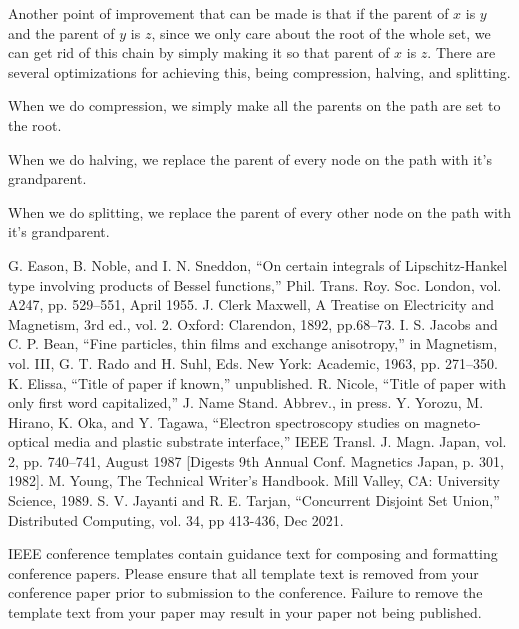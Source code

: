 \documentclass[conference]{IEEEtran}
\begin{document}
Another point of improvement that can be made is that if the parent of $x$ is $y$ and the parent of $y$ is $z$, since we only care about the root of the whole set, we can get rid of this chain by simply making it so that parent of $x$ is $z$. There are several optimizations for achieving this, being compression, halving, and splitting.

When we do compression, we simply make all the parents on the path are set to the root.



When we do halving, we replace the parent of every node on the path with it's grandparent.



When we do splitting, we replace the parent of every other node on the path with it's grandparent.



\begin{thebibliography}{00}
 G. Eason, B. Noble, and I. N. Sneddon, ``On certain integrals of Lipschitz-Hankel type involving products of Bessel functions,'' Phil. Trans. Roy. Soc. London, vol. A247, pp. 529--551, April 1955.
 J. Clerk Maxwell, A Treatise on Electricity and Magnetism, 3rd ed., vol. 2. Oxford: Clarendon, 1892, pp.68--73.
 I. S. Jacobs and C. P. Bean, ``Fine particles, thin films and exchange anisotropy,'' in Magnetism, vol. III, G. T. Rado and H. Suhl, Eds. New York: Academic, 1963, pp. 271--350.
 K. Elissa, ``Title of paper if known,'' unpublished.
 R. Nicole, ``Title of paper with only first word capitalized,'' J. Name Stand. Abbrev., in press.
 Y. Yorozu, M. Hirano, K. Oka, and Y. Tagawa, ``Electron spectroscopy studies on magneto-optical media and plastic substrate interface,'' IEEE Transl. J. Magn. Japan, vol. 2, pp. 740--741, August 1987 [Digests 9th Annual Conf. Magnetics Japan, p. 301, 1982].
 M. Young, The Technical Writer's Handbook. Mill Valley, CA: University Science, 1989.
 S. V. Jayanti and R. E. Tarjan, ``Concurrent Disjoint Set Union,'' Distributed Computing, vol. 34, pp 413-436, Dec 2021.
\end{thebibliography}
\vspace{12pt}
\color{red}
IEEE conference templates contain guidance text for composing and formatting conference papers. Please ensure that all template text is removed from your conference paper prior to submission to the conference. Failure to remove the template text from your paper may result in your paper not being published.
\end{document}
